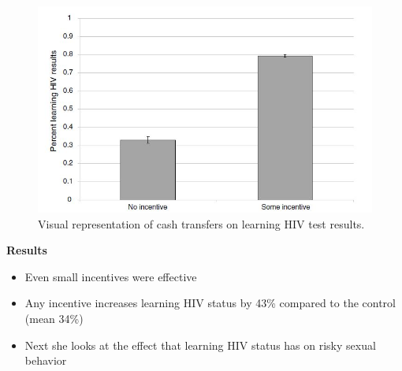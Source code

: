 \documentclass[notes=show]{beamer}
\begin{document}
\begin{frame}[plain]

\begin{figure}[htb]\centering
\includegraphics[scale=0.5]{./lecture_includes/FigA.jpg}
\caption{Visual representation of cash transfers on learning HIV test results.}
\label{fig:thorntonfig}
\end{figure}

\end{frame}


\begin{frame}[plain]
\begin{center}
\textbf{Results}
\end{center}

\begin{itemize}
\item Even small incentives were effective
\item Any incentive increases learning HIV status by 43\% compared to the control (mean 34\%)
\item Next she looks at the effect that learning HIV status has on risky sexual behavior
\end{itemize}

\end{frame}
\end{document}

